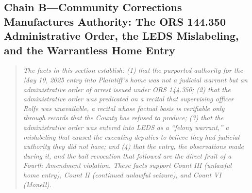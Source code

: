 \documentclass[12pt,letterpaper]{article}
\begin{document}
	\subsection*{Chain B---Community Corrections Manufactures Authority: The ORS 144.350 Administrative Order, the LEDS Mislabeling, and the Warrantless Home Entry}
	\begin{quote}
		\textit{The facts in this section establish: (1) that the
			purported authority for the May 10, 2025 entry into
			Plaintiff's home was not a judicial warrant but an
			administrative order of arrest issued under ORS 144.350;
			(2) that the administrative order was predicated on a recital
			that supervising officer Rolfe was unavailable, a recital whose
			factual basis is verifiable only through records that the
			County has refused to produce; (3) that the administrative
			order was entered into LEDS as a ``felony warrant,'' a
			mislabeling that caused the executing deputies to believe they
			had judicial authority they did not have; and (4) that the
			entry, the observations made during it, and the bail revocation
			that followed are the direct fruit of a Fourth Amendment
			violation. These facts support Count III (unlawful home entry),
			Count II (continued unlawful seizure), and Count VI (Monell).}
	\end{quote}
\end{document}
